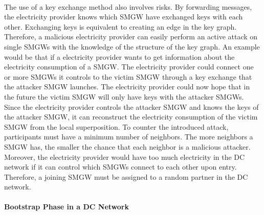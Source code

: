 \\The use of a key exchange method also involves risks. By forwarding messages, the electricity provider knows which \gls{SMGW} have exchanged keys with each other. Exchanging keys is equivalent to creating an edge in the key graph. %
Therefore, a malicious electricity provider can easily perform an active attack on single \gls{SMGW}s with the knowledge of the structure of the key graph. %
An example would be that if a electricity provider wants to get information about the electricity consumption of a \gls{SMGW}. The electricity provider could connect one or more \gls{SMGW}s it controls to the victim \gls{SMGW} through a key exchange that the attacker \gls{SMGW} launches. The electricity provider could now hope that in the future the victim \gls{SMGW} will only have keys with the attacker \gls{SMGW}s. Since the electricity provider controls the attacker \gls{SMGW} and knows the keys of the attacker \gls{SMGW}, it can reconstruct the electricity consumption of the victim \gls{SMGW} from the local superposition. To counter the introduced attack, participants must have a minimum number of neighbors. The more neighbors a \gls{SMGW} has, the smaller the chance that each neighbor is a malicious attacker. Moreover, the electricity provider would have too much electricity in the DC network if it can control which \gls{SMGW}s connect to each other upon entry. Therefore, a joining \gls{SMGW} must be assigned to a random partner in the DC network.\\ %
\\
\textbf{Bootstrap Phase in a DC Network}
\\
\\
